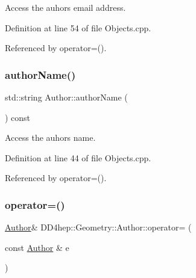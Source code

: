 Access the auhor\textquotesingle{}s email address. 



Definition at line 54 of file Objects.\+cpp.



Referenced by operator=().

\hypertarget{class_d_d4hep_1_1_geometry_1_1_author_a3b434ef224a2ca41cce53314117048b0}{}\label{class_d_d4hep_1_1_geometry_1_1_author_a3b434ef224a2ca41cce53314117048b0} 
\subsubsection{\texorpdfstring{author\+Name()}{authorName()}}
{\footnotesize\ttfamily std\+::string Author\+::author\+Name (\begin{DoxyParamCaption}{ }\end{DoxyParamCaption}) const}



Access the auhor\textquotesingle{}s name. 



Definition at line 44 of file Objects.\+cpp.



Referenced by operator=().

\hypertarget{class_d_d4hep_1_1_geometry_1_1_author_a59a753444504866fdb2c4e798823cd17}{}\label{class_d_d4hep_1_1_geometry_1_1_author_a59a753444504866fdb2c4e798823cd17} 
\subsubsection{\texorpdfstring{operator=()}{operator=()}}
{\footnotesize\ttfamily \hyperlink{class_d_d4hep_1_1_geometry_1_1_author}{Author}\& D\+D4hep\+::\+Geometry\+::\+Author\+::operator= (\begin{DoxyParamCaption}\item[{const \hyperlink{class_d_d4hep_1_1_geometry_1_1_author}{Author} \&}]{e }\end{DoxyParamCaption})\hspace{0.3cm}{\ttfamily [inline]}}



